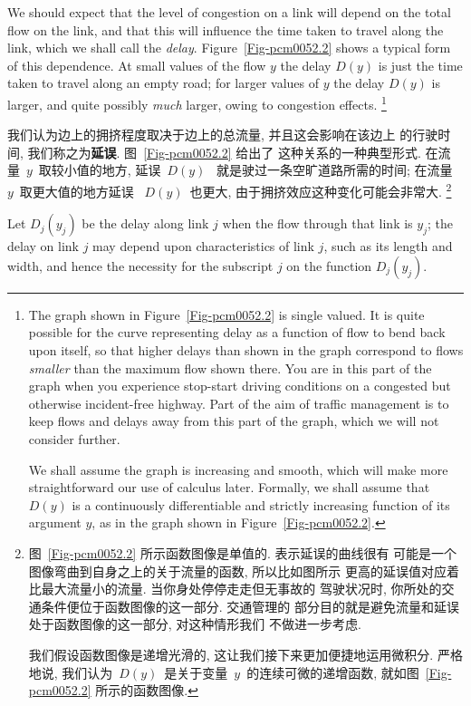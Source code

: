 \documentclass[a4paper,12pt, twocolumn]{article}
\begin{document}
We should expect that the level of congestion on a link 
will depend on the total flow on the link, and that this 
will influence the time taken to travel along the link,
which we shall call the {\it delay}.
Figure~\ref{Fig-pcm0052.2} shows a typical form of this
dependence. At small values of the flow $y$ the delay $D(y)$
is just the time taken to travel along an empty road; for 
larger values of $y$ the delay $D(y)$ is larger, and
quite possibly {\it much} larger, owing to
congestion effects.
\footnote{The graph shown in 
Figure~\ref{Fig-pcm0052.2} is single valued. It is quite possible
for the curve representing delay as a function of flow 
to bend back upon itself, so that higher 
delays than shown in the graph correspond to  flows
{\it smaller} than the maximum flow shown there.
You are in this part of the graph when you
experience stop-start driving conditions on a
congested but otherwise 
incident-free highway.  
Part of the aim of traffic management is to keep                         
flows and delays away from this part of the graph,
which we will  not consider further.

We shall assume the graph is
increasing and smooth, which will make more straightforward our
use of calculus later.
Formally, we shall assume that $D(y)$ is
a continuously differentiable
and strictly increasing function of its argument $y$,
as in the graph shown in Figure~\ref{Fig-pcm0052.2}.
}

我们认为边上的拥挤程度取决于边上的总流量, 并且这会影响在该边上
的行驶时间, 我们称之为\textbf{延误}. 图~\ref{Fig-pcm0052.2} 给出了
这种关系的一种典型形式. 在流量~$y$~取较小值的地方, 延误~$D(y)$~
就是驶过一条空旷道路所需的时间; 在流量~$y$~取更大值的地方延误
~$D(y)$~也更大, 由于拥挤效应这种变化可能会非常大. 
\footnote{
图~\ref{Fig-pcm0052.2} 所示函数图像是单值的. 表示延误的曲线很有
可能是一个图像弯曲到自身之上的关于流量的函数, 所以比如图所示
更高的延误值对应着比最大流量小的流量. 当你身处停停走走但无事故的
驾驶状况时, 你所处的交通条件便位于函数图像的这一部分. 交通管理的
部分目的就是避免流量和延误处于函数图像的这一部分, 对这种情形我们
不做进一步考虑. 

我们假设函数图像是递增光滑的, 这让我们接下来更加便捷地运用微积分. 
严格地说, 我们认为~$D(y)$~是关于变量~$y$~的连续可微的递增函数, 
就如图~\ref{Fig-pcm0052.2} 所示的函数图像. }

Let $D_j(y_j)$ be the delay along link $j$ when the flow
through that link is $y_j$; the delay on link $j$ may
depend upon characteristics of link $j$, such as its 
length and width, and hence the necessity for the
subscript $j$ on the function $D_j(y_j)$. 
\end{document}
